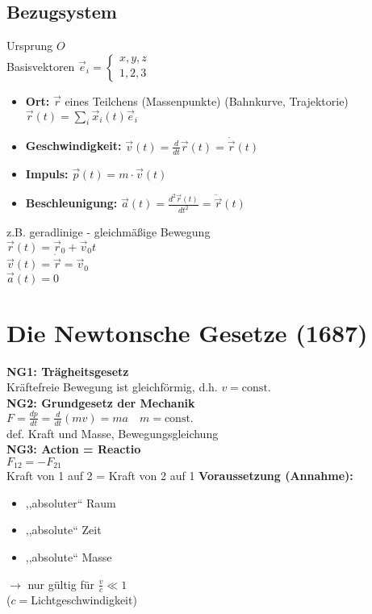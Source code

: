 \documentclass[titlepage,12pt,a4paper,ngerman]{report}
\newcommand{\tx}[1]{\textrm{#1}}
\newcommand{\const}{\tx{const.}}
\begin{document}
\subsection{Bezugsystem}
Ursprung $O$\\
Basisvektoren $\vec{e}_{i}= \left\{\begin{array}{ll} x,y,z \\1,2,3\end{array}\right. $ \\	
\begin{itemize}
\item \textbf{Ort:} $\vec{r}$ eines Teilchens (Massenpunkte) (Bahnkurve, Trajektorie) $\vec{r}(t) = \sum_{i} \vec{x}_{i}(t)\vec{e}_{i}$\\
\item \textbf{Geschwindigkeit:} $\vec{v}(t) = \frac{d}{dt} \vec{r}(t) = \dot{\vec{r}}(t)$\\
\item \textbf{Impuls:} $ \vec{p}(t) = m\cdot \vec{v}(t)$\\
\item \textbf{Beschleunigung:} $\vec{a}(t) = \frac{d^{2}\vec{r}(t)}{dt^{2}} = \ddot{\vec{r}} (t)$\\
\end{itemize}
z.B. geradlinige - gleichmäßige Bewegung\\
$\vec{r}(t) = \vec{r}_{0} + \vec{v}_{0} t$\\
$\vec{v}(t) = \dot{\vec{r}}  = \vec{v}_{0}$\\
$\vec{a}(t) = 0$

\section{Die Newtonsche Gesetze (1687)} %
\textbf{NG1: Trägheitsgesetz}\\
Kräftefreie Bewegung ist gleichförmig, d.h. $v = \const$\\[5pt]
\textbf{NG2: Grundgesetz der Mechanik}\\
$ F = \frac{dp}{dt} = \frac{d}{dt}(mv) = ma \quad m = \const$\\
def. Kraft und Masse, Bewegungsgleichung\\[5pt]
\textbf{NG3: Action = Reactio}\\
$F_{12} = -F_{21}$\\
Kraft von 1 auf 2 = Kraft von 2 auf 1
\textbf{Voraussetzung (Annahme):}
\begin{itemize}
\item ,,absoluter`` Raum
\item ,,absolute`` Zeit
\item ,,absolute`` Masse
\end{itemize}
$\rightarrow$ nur gültig für $\frac{v}{c} \ll 1$\\
($c = $Lichtgeschwindigkeit)\\[5pt]
\end{document}
